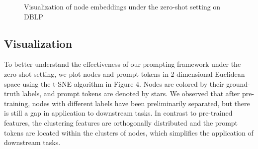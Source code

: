 \begin{figure}[t]
    \centering
    \vspace{-3mm}
    \caption{Visualization of node embeddings under the zero-shot setting on DBLP}
    \label{fig::visualization}
\end{figure}

\subsection{Visualization}

To better understand the effectiveness of our prompting framework under the zero-shot setting, we plot nodes and prompt tokens in 2-dimensional Euclidean space using the t-SNE algorithm in Figure 4. Nodes are colored by their ground-truth labels, and prompt tokens are denoted by stars. We observed that after pre-training, nodes with different labels have been preliminarily separated, but there is still a gap in application to downstream tasks. In contrast to pre-trained features, the clustering features are orthogonally distributed and the prompt tokens are located within the clusters of nodes, which simplifies the application of downstream tasks.